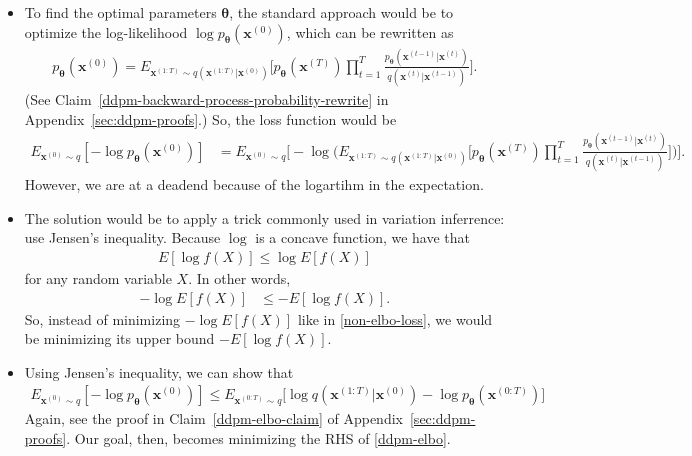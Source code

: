 \documentclass[10pt]{article}
\newcommand{\ve}[1]{\mathbf{#1}}
\newcommand{\ves}[1]{\boldsymbol{#1}}
\begin{document}
\begin{itemize}
\item To find the optimal parameters $\ves{\theta}$, the standard approach would be to optimize the log-likelihood $\log p_{\ves{\theta}}(\ve{x}^{(0)})$, which can be rewritten as
\begin{align*}
  p_{\ves{\theta}}(\ve{x}^{(0)}) = E_{\ve{x}^{(1:T)} \sim q(\ve{x}^{(1:T)}|\ve{x}^{(0)})} \bigg[ p_{\ves{\theta}}(\ve{x}^{(T)}) \prod_{t=1}^T \frac{ p_{\ves{\theta}}(\ve{x}^{(t-1)}|\ve{x}^{(t)})}{ q(\ve{x}^{(t)}|\ve{x}^{(t-1)})} \bigg].
\end{align*}
(See Claim~\ref{ddpm-backward-process-probability-rewrite} in Appendix~\ref{sec:ddpm-proofs}.) So, the loss function would be
\begin{align}
  E_{\ve{x}^{(0)} \sim q} [-\log p_{\ves{\theta}}(\ve{x}^{(0)})] 
  &= E_{\ve{x}^{(0)} \sim q} \bigg[ -\log \bigg( E_{\ve{x}^{(1:T)} \sim q(\ve{x}^{(1:T)}|\ve{x}^{(0)})} \bigg[ p_{\ves{\theta}}(\ve{x}^{(T)}) \prod_{t=1}^T \frac{ p_{\ves{\theta}}(\ve{x}^{(t-1)}|\ve{x}^{(t)})}{ q(\ve{x}^{(t)}|\ve{x}^{(t-1)})} \bigg] \bigg) \bigg]. \label{non-elbo-loss}
\end{align}
However, we are at a deadend because of the logartihm in the expectation.

\item The solution would be to apply a trick commonly used in variation inferrence: use Jensen's inequality. Because $\log$ is a concave function, we have that
\begin{align*}
  E [\log f(X)] \leq \log E[f(X)]
\end{align*}
for any random variable $X$. In other words,
\begin{align*}
  -\log E[f(X)] &\leq -E[\log f(X)].
\end{align*}
So, instead of minimizing $-\log E[f(X)]$ like in \eqref{non-elbo-loss}, we would be minimizing its upper bound $-E[ \log f(X)]$.

\item Using Jensen's inequality, we can show that
\begin{align}
  E_{\ve{x}^{(0)} \sim q} [-\log p_{\ves{\theta}}(\ve{x}^{(0)})]  \leq E_{\ve{x}^{(0:T)} \sim q}\Big[ \log q(\ve{x}^{(1:T)}|\ve{x}^{(0)}) - \log p_{\ves{\theta}}(\ve{x}^{(0:T)}) \Big] \label{ddpm-elbo}
\end{align}
Again, see the proof in Claim~\ref{ddpm-elbo-claim} of Appendix~\ref{sec:ddpm-proofs}. Our goal, then, becomes minimizing the RHS of \eqref{ddpm-elbo}. 


\end{itemize}
\end{document}
